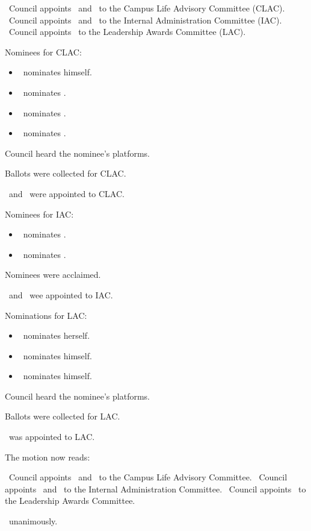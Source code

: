 \begin{motion}
    \birt\ Council appoints \blank\ and \blank\ to the Campus Life Advisory
    Committee (CLAC).
    \bifrt\ Council appoints \blank\ and \blank\ to the Internal Administration
    Committee (IAC).
    \bifrt\  Council appoints \blank\ to the Leadership Awards Committee (LAC).
    \movers{\jill}{\andrewc}

    Nominees for CLAC:\begin{itemize}
        \item \tomson\ nominates himself.
        \item \alexander\ nominates \seneca.
        \item \alexander\ nominates \nickta.
        \item \andrewc\ nominates \abigail.
    \end{itemize}

    Council heard the nominee's platforms.

    Ballots were collected for CLAC.\@

    \seneca\ and \tomson\ were appointed to CLAC.\@

    Nominees for IAC:\begin{itemize}
        \item \seneca\ nominates \alexander.
        \item \seneca\ nominates \jennifer.
    \end{itemize}

    Nominees were acclaimed.

    \alexander\ and \jennifer\ wee appointed to IAC.\@

    Nominations for LAC:\begin{itemize}
        \item \stephanie\ nominates herself.
        \item \tomson\ nominates himself.
        \item \subham\ nominates himself.
    \end{itemize}

    Council heard the nominee's platforms.

    Ballots were collected for LAC.\@

    \stephanie\ was appointed to LAC.\@

    The motion now reads:
    \begin{motion}
        \birt\ Council appoints \seneca\ and \tomson\ to the Campus Life
        Advisory Committee.
        \bifrt\ Council appoints \alexander\ and \jennifer\ to the Internal
        Administration Committee.
        \bifrt\ Council appoints \stephanie\ to the Leadership Awards
        Committee.
    \end{motion}

    \carries\ unanimously.
\end{motion}

